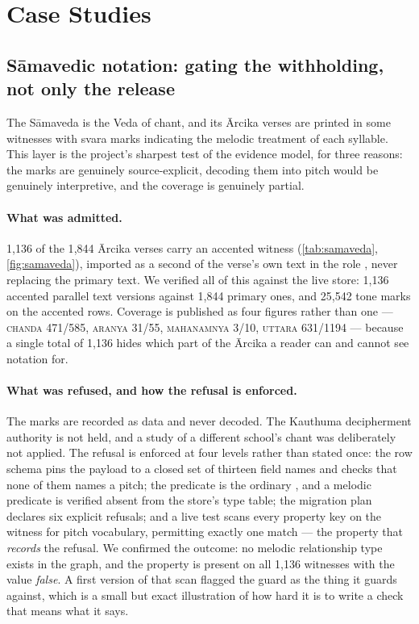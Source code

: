 \section{Case Studies}
\label{sec:cases}

\subsection{S\=amavedic notation: gating the withholding, not only the release}
\label{sec:case-samaveda}

The S\=amaveda is the Veda of chant, and its \=Arcika verses are printed in some
witnesses with svara marks indicating the melodic treatment of each syllable. This
layer is the project's sharpest test of the evidence model, for three reasons: the
marks are genuinely source-explicit, decoding them into pitch would be genuinely
interpretive, and the coverage is genuinely partial.

\paragraph{What was admitted.} 1{,}136 of the 1{,}844 \=Arcika verses carry an
accented witness (\cref{tab:samaveda}, \cref{fig:samaveda}), imported as a second
 of
the verse's own text in the role , never replacing the primary
text. We verified all of this against the live store: 1{,}136 accented parallel text
versions against 1{,}844 primary ones, and 25{,}542 tone marks on the accented rows.
Coverage is published as four figures rather than one --- \textsc{chanda} 471/585,
\textsc{aranya} 31/55, \textsc{mahanamnya} 3/10, \textsc{uttara} 631/1194 --- because
a single total of 1{,}136 hides which part of the \=Arcika a reader can and cannot
see notation for.

\paragraph{What was refused, and how the refusal is enforced.} The marks are recorded
as data and never decoded. The Kauthuma decipherment authority is not held, and a
study of a different school's chant was deliberately not applied. The refusal is
enforced at four levels rather than stated once: the row schema pins the payload to a
closed set of thirteen field names and checks that none of them names a pitch; the
predicate is the ordinary , and a melodic predicate is
verified absent from the store's type table; the migration plan declares six explicit
refusals; and a live test scans every property key on the witness for pitch
vocabulary, permitting exactly one match --- the property that \emph{records} the
refusal. We confirmed the outcome: no melodic relationship type exists in the graph,
and the property  is present on all
1{,}136 witnesses with the value \emph{false}. A first version of that scan flagged
the guard as the thing it guards against, which is a small but exact illustration of
how hard it is to write a check that means what it says.

